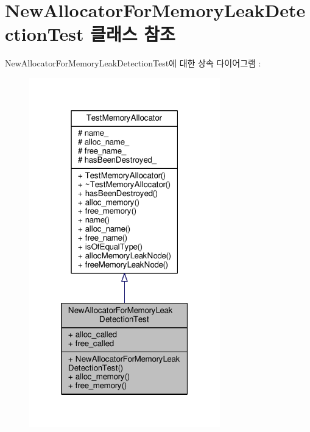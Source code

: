 \hypertarget{class_new_allocator_for_memory_leak_detection_test}{}\section{New\+Allocator\+For\+Memory\+Leak\+Detection\+Test 클래스 참조}
\label{class_new_allocator_for_memory_leak_detection_test}


New\+Allocator\+For\+Memory\+Leak\+Detection\+Test에 대한 상속 다이어그램 \+: 
\nopagebreak
\begin{figure}[H]
\begin{center}
\leavevmode
\includegraphics[width=235pt]{class_new_allocator_for_memory_leak_detection_test__inherit__graph}
\end{center}
\end{figure}


